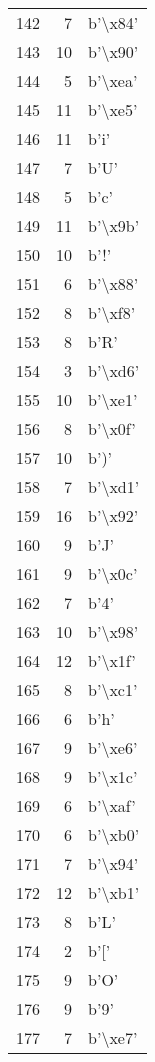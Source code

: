 \begin{tabular}{lrl}
142 &    7 &  b'\textbackslash x84' \\
143 &   10 &  b'\textbackslash x90' \\
144 &    5 &  b'\textbackslash xea' \\
145 &   11 &  b'\textbackslash xe5' \\
146 &   11 &     b'i' \\
147 &    7 &     b'U' \\
148 &    5 &     b'c' \\
149 &   11 &  b'\textbackslash x9b' \\
150 &   10 &     b'!' \\
151 &    6 &  b'\textbackslash x88' \\
152 &    8 &  b'\textbackslash xf8' \\
153 &    8 &     b'R' \\
154 &    3 &  b'\textbackslash xd6' \\
155 &   10 &  b'\textbackslash xe1' \\
156 &    8 &  b'\textbackslash x0f' \\
157 &   10 &     b')' \\
158 &    7 &  b'\textbackslash xd1' \\
159 &   16 &  b'\textbackslash x92' \\
160 &    9 &     b'J' \\
161 &    9 &  b'\textbackslash x0c' \\
162 &    7 &     b'4' \\
163 &   10 &  b'\textbackslash x98' \\
164 &   12 &  b'\textbackslash x1f' \\
165 &    8 &  b'\textbackslash xc1' \\
166 &    6 &     b'h' \\
167 &    9 &  b'\textbackslash xe6' \\
168 &    9 &  b'\textbackslash x1c' \\
169 &    6 &  b'\textbackslash xaf' \\
170 &    6 &  b'\textbackslash xb0' \\
171 &    7 &  b'\textbackslash x94' \\
172 &   12 &  b'\textbackslash xb1' \\
173 &    8 &     b'L' \\
174 &    2 &     b'[' \\
175 &    9 &     b'O' \\
176 &    9 &     b'9' \\
177 &    7 &  b'\textbackslash xe7' \\

\end{tabular}
